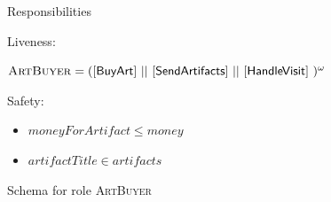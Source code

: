 \documentclass[paper=letter, fontsize=12pt]{article}
\begin{document}
\begin{figure}[H]
\begin{center}
{{%

\setlength\parindent{14pt} Responsibilities
\par \setlength\parindent{14pt} Liveness:
\par\setlength\parindent{75pt}$\text{\textsc{ArtBuyer}} = (\text{{\fontfamily{\sfdefault}\selectfont 
$[$BuyArt$]$ || $[$SendArtifacts$]$ ||  $[$HandleVisit$]$ }})^{\omega}$

\par \setlength\parindent{14pt} Safety:
\begin{itemize}[leftmargin=20mm]
\item $moneyForArtifact \leq money$
\item $artifactTitle \in artifacts$
\end{itemize}
    }%
}
\caption{Schema for role \textsc{ArtBuyer}}
\label{fig:role_art_buyer}
\end{center}
\end{figure}
\end{document}
